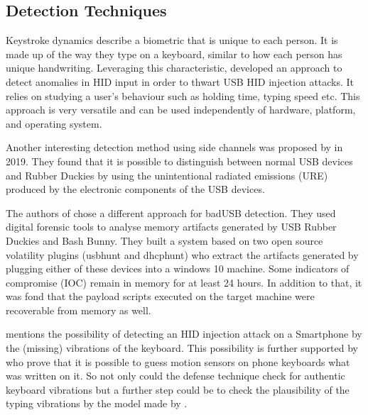 \subsection{Detection Techniques}


Keystroke dynamics describe a biometric that is unique to each person. It is made up of the way they type on a keyboard, similar to how each person has unique handwriting. Leveraging this characteristic, \cite{barbhuiyaAnomalyBasedApproach2012} developed an approach to detect anomalies in HID input in order to thwart USB HID injection attacks. It relies on studying a user's behaviour such as holding time, typing speed etc. This approach is very versatile and can be used independently of hardware, platform, and operating system.  

Another interesting detection method using side channels was proposed by \cite{ibrahimRFDNAFingerprintingDetection2019} in 2019. They found that it is possible to distinguish between normal USB devices and Rubber Duckies by using the unintentional radiated emissions (URE) produced by the electronic components of the USB devices. 

The authors of \cite{thomasDuckHuntMemory2021} chose a different approach for badUSB detection. They used digital forensic tools to analyse memory artifacts generated by USB Rubber Duckies and Bash Bunny. They built a system based on two open source volatility plugins (usbhunt and dhcphunt) who extract the artifacts generated by plugging either of these devices into a windows 10 machine. Some indicators of compromise (IOC) remain in memory for at least 24 hours. In addition to that, it was fond that the payload scripts executed on the target machine were recoverable from memory as well. 

\cite{bojovicRisingThreatHardware2019} mentions the possibility of detecting an HID injection attack on a Smartphone by the (missing) vibrations of the keyboard. This possibility is further supported by \cite{zhuangKeyboardAcousticEmanations2009} who prove that it is possible to guess motion sensors on phone keyboards what was written on it. So not only could the defense technique check for authentic keyboard vibrations but a further step could be to check the plausibility of the typing vibrations by the model made by \cite{zhuangKeyboardAcousticEmanations2009}. 

